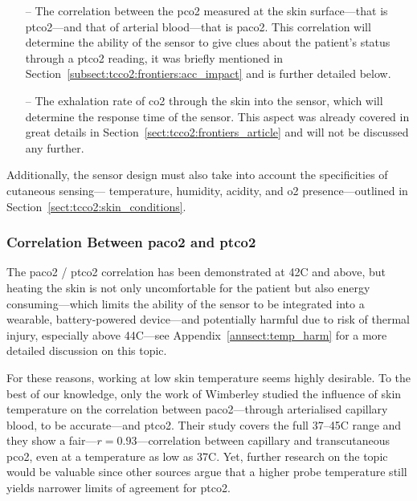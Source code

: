 \begin{enumerate}
	\item[--] The correlation between the \gls{pco2} measured at the skin surface---that is \gls{ptco2}---and that of arterial blood---that is \gls{paco2}. This correlation will determine the ability of the sensor to give clues about the patient's status through a \gls{ptco2} reading, it was briefly mentioned in Section~\ref{subsect:tcco2:frontiers:acc_impact} and is further detailed below.
	\item[--] The exhalation rate of \gls{co2} through the skin into the sensor, which will determine the response time of the sensor. This aspect was already covered in great details in Section~\ref{sect:tcco2:frontiers_article} and will not be discussed any further.
\end{enumerate}

Additionally, the sensor design must also take into account the specificities of cutaneous sensing---\ie{} temperature, humidity, acidity, and \gls{o2} presence---outlined in Section~\ref{sect:tcco2:skin_conditions}.

\subsubsection{Correlation Between \texorpdfstring{\gls{paco2}}{paCO2} and \texorpdfstring{\gls{ptco2}}{tcpCO2}}\label{subsect:choos:techno_choice:correl_pa_ptc}

The \gls{paco2} / \gls{ptco2} correlation has been demonstrated at 42{\degree}C and above\cite{conway2018}, but heating the skin is not only uncomfortable for the patient but also energy consuming---which limits the ability of the sensor to be integrated into a wearable, battery-powered device---and potentially harmful due to risk of thermal injury, especially above 44{\degree}C---see Appendix~\ref{annsect:temp_harm} for a more detailed discussion on this topic.

For these reasons, working at low skin temperature seems highly desirable. To the best of our knowledge, only the work of Wimberley \etal{}\cite{wimberley1985a} studied the influence of skin temperature on the correlation between \gls{paco2}---through arterialised capillary blood, to be accurate---and \gls{ptco2}. Their study covers the full 37--45{\degree}C range and they show a fair---$r=0.93$---correlation between capillary and transcutaneous \gls{pco2}, even at a temperature as low as 37{\degree}C. Yet, \mfrin{}further research on the topic would be valuable since other sources argue that a higher probe temperature still yields narrower limits of agreement for \gls{ptco2}\cite{conway2018}.

